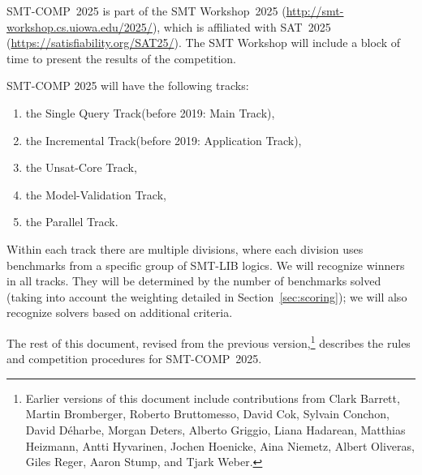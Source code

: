 \documentclass[12pt]{article}
\newcommand{\maintrack}{Single Query Track\xspace}
\newcommand{\inctrack}{Incremental Track\xspace}
\newcommand{\ucoretrack}{Unsat-Core Track\xspace}
\newcommand{\mvaltrack}{Model-Validation Track\xspace}
\newcommand{\paralleltrack}{Parallel Track\xspace}
\begin{document}
SMT-COMP~2025 is part of the SMT Workshop~2025
(\url{http://smt-workshop.cs.uiowa.edu/2025/}),
which is affiliated with SAT~2025 (\url{https://satisfiability.org/SAT25/}).
The SMT Workshop will include a block of time to present the results of the
competition.

SMT-COMP 2025 will have the following tracks:
\begin{enumerate}
  \item the \maintrack (before 2019: Main Track),
  \item the \inctrack (before 2019: Application Track),
  \item the \ucoretrack,
  \item the \mvaltrack,
  \item the \paralleltrack{}.
\end{enumerate}

%
Within each track there are multiple divisions, where each division
uses benchmarks from a specific group of SMT-LIB logics.
%
We will recognize winners in all tracks.
%
They will be determined by the number of benchmarks solved (taking into account
the weighting detailed in Section~\ref{sec:scoring}); we will also recognize
solvers based on additional criteria.

The rest of this document, revised from the previous
version,\footnote{Earlier versions of this document include
  contributions from Clark Barrett, Martin Bromberger, Roberto Bruttomesso, David Cok,
  Sylvain Conchon, David D{\'e}harbe, Morgan Deters, Alberto Griggio,
  Liana Hadarean,
  Matthias Heizmann, Antti Hyvarinen, Jochen Hoenicke, Aina Niemetz, Albert Oliveras, Giles Reger, Aaron Stump,
  and Tjark Weber.}  describes the rules and competition procedures for
SMT-COMP~2025.
%
\end{document}

